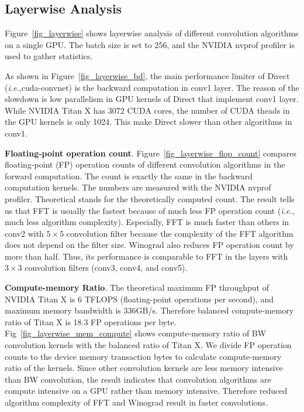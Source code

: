 \subsection{Layerwise Analysis}

Figure~\ref{fig_layerwise} shows layerwise analysis of different convolution algorithms on a single GPU. The batch size is set to 256, and the NVIDIA nvprof profiler is used to gather statistics.

As shown in Figure~\ref{fig_layerwise_bd}, the main performance limiter of \textsf{Direct} (\textit{i.e.},cuda-convnet) is the backward computation in \textsf{conv1} layer. The reason of the slowdown is low parallelism in GPU kernels of \textsf{Direct} that implement \textsf{conv1} layer. While NVIDIA Titan X has 3072 CUDA cores, the number of CUDA theads in the GPU kernels is only 1024. This make \textsf{Direct} slower than other algorithms in \textsf{conv1}. 

{\bf Floating-point operation count}. Figure~\ref{fig_layerwise_flop_count} compares floating-point (FP) operation counts of different convolution algorithms in the forward computation. The count is exactly the same in the backward computation kernels. The numbers are measured with the NVIDIA nvprof profiler. \textsf{Theoretical} stands for the theoretically computed count. The result tells us that \textsf{FFT} is usually the fastest because of much less FP operation count (\textit{i.e.}, much less algorithm complexity). Especially, \textsf{FFT} is much faster than others in \textsf{conv2} with $5 \times 5$ convolution filter because the complexity of the FFT algorithm does not depend on the filter size. \textsf{Winograd} also reduces FP operation count by more than half. Thus, its performance is comparable to \textsf{FFT} in the layers with $3 \times 3$ convolution filters (\textsf{conv3}, \textsf{conv4}, and \textsf{conv5}).

{\bf Compute-memory Ratio}. The theoretical maximum FP throughput of NVIDIA Titan X is 6 TFLOPS (floating-point operations per second), and maximum memory bandwidth is 336GB/s. Therefore balanced compute-memory ratio of Titan X is 18.3 FP operations per byte. Fig~\ref{fig_layerwise_mem_compute} shows compute-memory ratio of \textsf{BW} convolution kernels with the balanced ratio of Titan X. We divide FP operation counts to the device memory transaction bytes to calculate compute-memory ratio of the kernels. Since other convolution kernels are less memory intensive than \textsf{BW} convolution, the result indicates that convolution algorithms are compute intensive on a GPU rather than memory intensive. Therefore reduced algorithm complexity of \textsf{FFT} and \textsf{Winograd} result in faster convolutions. 

